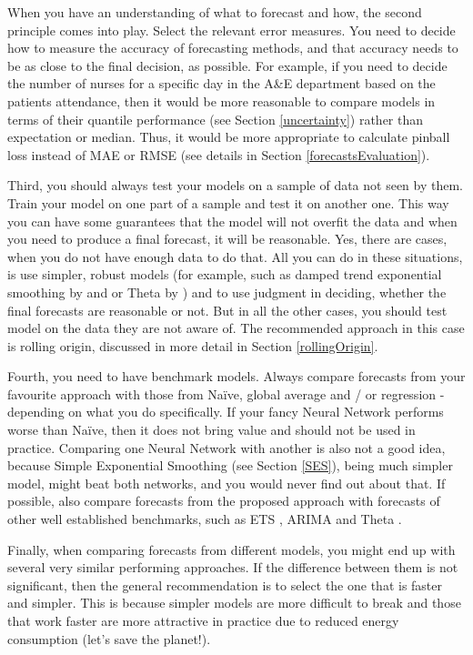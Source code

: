 \documentclass[
]{book}
\theoremstyle{definition}
\theoremstyle{definition}
\theoremstyle{definition}
\theoremstyle{definition}
\theoremstyle{remark}
\begin{document}
When you have an understanding of what to forecast and how, the second principle comes into play. Select the relevant error measures. You need to decide how to measure the accuracy of forecasting methods, and that accuracy needs to be as close to the final decision, as possible. For example, if you need to decide the number of nurses for a specific day in the A\&E department based on the patients attendance, then it would be more reasonable to compare models in terms of their quantile performance (see Section \ref{uncertainty}) rather than expectation or median. Thus, it would be more appropriate to calculate pinball loss instead of MAE or RMSE (see details in Section \ref{forecastsEvaluation}).

Third, you should always test your models on a sample of data not seen by them. Train your model on one part of a sample and test it on another one. This way you can have some guarantees that the model will not overfit the data and when you need to produce a final forecast, it will be reasonable. Yes, there are cases, when you do not have enough data to do that. All you can do in these situations, is use simpler, robust models (for example, such as damped trend exponential smoothing by \citet{Roberts1982} and \citet{Gardner1985a} or Theta by \citet{Assimakopoulos2000}) and to use judgment in deciding, whether the final forecasts are reasonable or not. But in all the other cases, you should test model on the data they are not aware of. The recommended approach in this case is rolling origin, discussed in more detail in Section \ref{rollingOrigin}.

Fourth, you need to have benchmark models. Always compare forecasts from your favourite approach with those from Naïve, global average and / or regression - depending on what you do specifically. If your fancy Neural Network performs worse than Naïve, then it does not bring value and should not be used in practice. Comparing one Neural Network with another is also not a good idea, because Simple Exponential Smoothing (see Section \ref{SES}), being much simpler model, might beat both networks, and you would never find out about that. If possible, also compare forecasts from the proposed approach with forecasts of other well established benchmarks, such as ETS \citep{Hyndman2008b}, ARIMA \citep{Box1976} and Theta \citep{Assimakopoulos2000}.

Finally, when comparing forecasts from different models, you might end up with several very similar performing approaches. If the difference between them is not significant, then the general recommendation is to select the one that is faster and simpler. This is because simpler models are more difficult to break and those that work faster are more attractive in practice due to reduced energy consumption (let's save the planet!).
\end{document}
